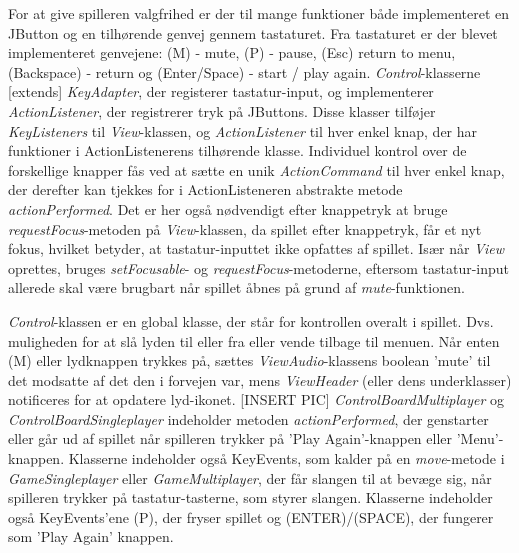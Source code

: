 For at give spilleren valgfrihed er der til mange funktioner både implementeret en JButton og en tilhørende genvej gennem tastaturet. Fra tastaturet er der blevet implementeret genvejene: (M) - mute, (P) - pause, (Esc) return to menu, (Backspace) - return og (Enter/Space) - start / play again. \textit{Control}-klasserne [extends] \textit{KeyAdapter}, der registerer tastatur-input, og implementerer \textit{ActionListener}, der registrerer tryk på JButtons. Disse klasser tilføjer \textit{KeyListeners} til \textit{View}-klassen, og \textit{ActionListener} til hver enkel knap, der har funktioner i ActionListenerens tilhørende klasse. Individuel kontrol over de forskellige knapper fås ved at sætte en unik \textit{ActionCommand} til hver enkel knap, der derefter kan tjekkes for i ActionListeneren abstrakte metode \textit{actionPerformed}. Det er her også nødvendigt efter knappetryk at bruge \textit{requestFocus}-metoden på \textit{View}-klassen, da spillet efter knappetryk, får et nyt fokus, hvilket betyder, at tastatur-inputtet ikke opfattes af spillet.
Især når \textit{View} oprettes, bruges \textit{setFocusable}- og \textit{requestFocus}-metoderne, eftersom tastatur-input allerede skal være brugbart når spillet åbnes på grund af \textit{mute}-funktionen.

\textit{Control}-klassen er en global klasse, der står for kontrollen overalt i spillet. Dvs. muligheden for at slå lyden til eller fra eller vende tilbage til menuen. Når enten (M) eller lydknappen trykkes på, sættes \textit{ViewAudio}-klassens boolean 'mute' til det modsatte af det den i forvejen var, mens \textit{ViewHeader} (eller dens underklasser) notificeres for at opdatere lyd-ikonet. [INSERT PIC]
\textit{ControlBoardMultiplayer} og \textit{ControlBoardSingleplayer} indeholder metoden \textit{actionPerformed}, der genstarter eller går ud af spillet når spilleren trykker på 'Play Again'-knappen eller 'Menu'-knappen. Klasserne indeholder også KeyEvents, som kalder på en \textit{move}-metode i \textit{GameSingleplayer} eller \textit{GameMultiplayer}, der får slangen til at bevæge sig, når spilleren trykker på tastatur-tasterne, som styrer slangen. Klasserne indeholder også KeyEvents'ene (P), der fryser spillet og (ENTER)/(SPACE), der fungerer som 'Play Again' knappen.

